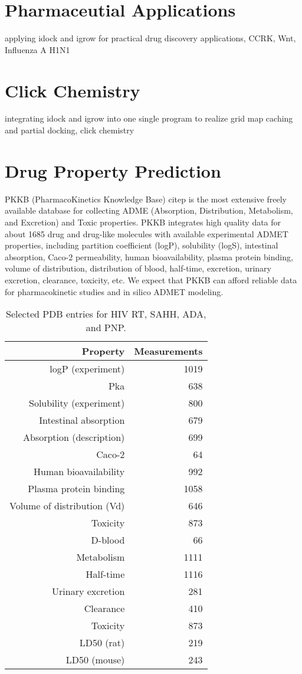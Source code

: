 \section{Pharmaceutial Applications}

applying idock and igrow for practical drug discovery applications, CCRK, Wnt, Influenza A H1N1

\section{Click Chemistry}

integrating idock and igrow into one single program to realize grid map caching and partial docking, click chemistry

\section{Drug Property Prediction}

PKKB (PharmacoKinetics Knowledge Base) citep{} is the most extensive freely available database for collecting ADME (Absorption, Distribution, Metabolism, and Excretion) and Toxic properties. PKKB integrates high quality data for about 1685 drug and drug-like molecules with available experimental ADMET properties, including partition coefficient (logP), solubility (logS), intestinal absorption, Caco-2 permeability, human bioavailability, plasma protein binding, volume of distribution, distribution of blood, half-time, excretion, urinary excretion, clearance, toxicity, etc. We expect that PKKB can afford reliable data for pharmacokinetic studies and in silico ADMET modeling.

\begin{table}
\centering
\begin{tabular*}
{\linewidth}
{@{\extracolsep{\fill}}rr}
\toprule
Property & Measurements \\
\midrule
logP (experiment) & 1019 \\
Pka & 638 \\
Solubility (experiment) & 800 \\
Intestinal absorption & 679 \\
Absorption (description) & 699 \\
Caco-2 & 64 \\
Human bioavailability & 992 \\
Plasma protein binding & 1058 \\
Volume of distribution (Vd) & 646 \\
Toxicity & 873 \\
D-blood & 66 \\
Metabolism & 1111 \\
Half-time & 1116 \\
Urinary excretion & 281 \\
Clearance & 410 \\
Toxicity & 873 \\
LD50 (rat) & 219 \\
LD50 (mouse) & 243 \\
\bottomrule
\end{tabular*}
\caption{Selected PDB entries for HIV RT, SAHH, ADA, and PNP.}
\label{tab:SelectedPDBEntries}
\end{table}

\chapterend

